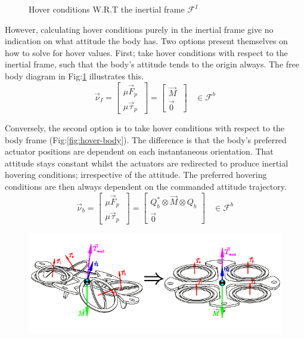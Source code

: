 {\begin{figure}[htbp]
\caption{Hover conditions W.R.T the inertial frame $\mathcal{F}^I$}
\label{fig:hover-inertial}
\end{figure}
\par
However, calculating hover conditions purely in the inertial frame give no indication on what attitude the body has. Two options present themselves on how to solve for hover values. First; take hover conditions with respect to the inertial frame, such that the body's attitude tends to the origin always. The free body diagram in Fig:\ref{fig:hover-inertial} illustrates this. 
\begin{equation}\label{eq:hover-inertial}
\vec{\nu}_I=
\begin{bmatrix}
\mu\vec{F}_p\hspace{3pt}\\
\mu\vec{\tau}_p\hspace{3pt}
\end{bmatrix}
=\begin{bmatrix}
\vec{M}\hspace{3pt}\\
\vec{0}\hspace{3pt}
\end{bmatrix}~~~~\in\mathcal{F}^b
\end{equation}
\par
Conversely, the second option is to take hover conditions with respect to the body frame (Fig:\ref{fig:hover-body}). The difference is that the body's preferred actuator positions are dependent on each instantaneous orientation. That attitude stays constant whilst the actuators are redirected to produce inertial hovering conditions; irrespective of the attitude. The preferred hovering conditions are then always dependent on the commanded attitude trajectory.
\begin{equation}\label{eq:hover-body}
\vec{\nu}_b=
\begin{bmatrix}
\mu\vec{F}_p\hspace{3pt}\\
\mu\vec{\tau}_p\hspace{3pt}
\end{bmatrix}
=\begin{bmatrix}
Q_b^*\otimes\vec{M}\otimes Q_b\\
\vec{0}
\end{bmatrix}~~~~\in\mathcal{F}^b
\end{equation}
\begin{figure}[htbp]
\centering
\includegraphics[width=\textwidth]{figs/hover-inertial}

\end{figure}}
